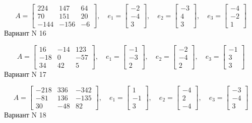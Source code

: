 \documentclass[11pt]{report}
\begin{document}
$$A = \left[\begin{matrix}224 & 147 & 64\\70 & 151 & 20\\-144 & -156 & -6\end{matrix}\right],\quad e_1 = \left[\begin{matrix}-2\\-4\\3\end{matrix}\right],\quad e_2 = \left[\begin{matrix}-3\\4\\3\end{matrix}\right],\quad e_3 = \left[\begin{matrix}-4\\-2\\1\end{matrix}\right]$$Вариант N 16

$$A = \left[\begin{matrix}16 & -14 & 123\\-18 & 0 & -57\\34 & 42 & 5\end{matrix}\right],\quad e_1 = \left[\begin{matrix}-1\\-3\\2\end{matrix}\right],\quad e_2 = \left[\begin{matrix}-2\\-4\\2\end{matrix}\right],\quad e_3 = \left[\begin{matrix}-1\\3\\3\end{matrix}\right]$$Вариант N 17

$$A = \left[\begin{matrix}-218 & 336 & -342\\-81 & 136 & -135\\30 & -48 & 82\end{matrix}\right],\quad e_1 = \left[\begin{matrix}1\\-1\\3\end{matrix}\right],\quad e_2 = \left[\begin{matrix}-4\\2\\-4\end{matrix}\right],\quad e_3 = \left[\begin{matrix}-3\\-4\\3\end{matrix}\right]$$Вариант N 18
\end{document}
